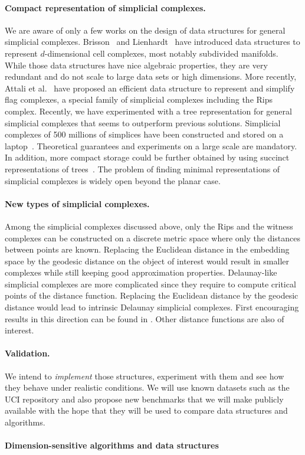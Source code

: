 \paragraph{Compact representation of simplicial complexes.} We are aware of only a few works on the design of data structures for general simplicial complexes. Brisson~\cite{Brisson:1989:RGS:73833.73858} and Lienhardt~\cite{DBLP:journals/ijcga/Lienhardt94} have introduced data structures to represent $d$-dimensional cell complexes, most notably subdivided manifolds. While those data structures have nice algebraic properties, they are very redundant and do not scale to large data sets or high dimensions. More recently, Attali et al.~\cite{Attali2011} have proposed an efficient data structure to represent and simplify flag complexes, a special family of simplicial complexes including the Rips complex. 
Recently, we have experimented with a tree representation for general simplicial
complexes that seems to outperform previous solutions. Simplicial complexes of 500 millions of simplices have been constructed and stored on a laptop~\cite{}. 
Theoretical guarantees and experiments on a large scale are mandatory. In
addition, more compact storage could be further obtained by using
succinct representations of trees~\cite{10.1109/SFCS.1989.63533,Munro:2002:SRB:586840.586885,Ferragina:2005:SLT:1097112.1097456,DBLP:conf/icalp/2003}. The problem of finding minimal representations of simplicial complexes is widely open beyond the planar case.


\paragraph{New types of simplicial complexes.}
Among the simplicial complexes discussed above, only the Rips and the witness complexes can be constructed on a discrete metric space where only the distances between points are known. 
Replacing the Euclidean distance in the embedding space by the geodesic distance on the object of interest would result in smaller complexes while still keeping good approximation properties.
Delaunay-like simplicial complexes are more complicated since they require to compute critical points of the  distance function. Replacing the Euclidean distance by  the geodesic distance would lead to intrinsic Delaunay simplicial complexes. First encouraging results in this direction can be found in \cite{}. Other distance functions are also of interest.


\paragraph{Validation.} 
We intend to {\em implement} those structures, experiment with them and see how they behave under realistic conditions. We will use known datasets such as the UCI repository \cite{} and also propose new benchmarks that we will make publicly available with the hope that they will be used to compare data structures and algorithms.

\paragraph{Dimension-sensitive algorithms and data structures} 







